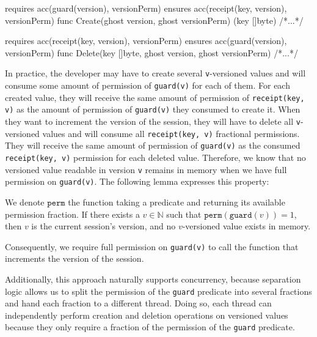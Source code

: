\begin{gobra}
requires acc(guard(version), versionPerm)
ensures  acc(receipt(key, version), versionPerm)
func Create(ghost version, ghost versionPerm) (key []byte) {/*...*/}

requires acc(receipt(key, version), versionPerm)
ensures  acc(guard(version), versionPerm)
func Delete(key []byte, ghost version, ghost versionPerm) {/*...*/}
\end{gobra}

In practice, the developer may have to create several \texttt{v}-versioned values and will consume some amount of permission of \texttt{guard(v)} for each of them.
For each created value, they will receive the same amount of permission of \texttt{receipt(key, v)} as the amount of permission of \texttt{guard(v)} they consumed to create it.
When they want to increment the version of the session, they will have to delete all \texttt{v}-versioned values and will consume all \texttt{receipt(key, v)} fractional permissions.
They will receive the same amount of permission of \texttt{guard(v)} as the consumed \texttt{receipt(key, v)} permission for each deleted value.
Therefore, we know that no versioned value readable in version \texttt{v} remains in memory when we have full permission on \texttt{guard(v)}.
The following lemma expresses this property:

\begin{lemma}\label{lem:full-guard-no-versioned-value}
    We denote $\texttt{perm}$ the function taking a predicate and returning its available permission fraction.
    If there exists a $v \in \mathbb{N}$ such that $\texttt{perm}(\texttt{guard}(v)) = 1$, then $v$ is the current session's version, and no $v$-versioned value exists in memory.
\end{lemma}

Consequently, we require full permission on \texttt{guard(v)} to call the function that increments the version of the session.

Additionally, this approach naturally supports concurrency, because separation logic allows us to split the permission of the \texttt{guard} predicate into several fractions and hand each fraction to a different thread.
Doing so, each thread can independently perform creation and deletion operations on versioned values because they only require a fraction of the permission of the \texttt{guard} predicate.

